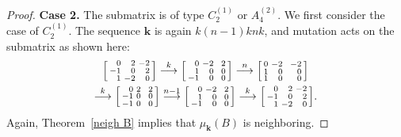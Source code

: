 \documentclass[10pt]{article}
\theoremstyle{definition}
\theoremstyle{remark}
\numberwithin{equation}{section}
\newcommand{\0}{{\mathbf{0}}}
\newcommand{\kk}{{\boldsymbol{k}}}
\begin{document}
\begin{proof}
\noindent
\textbf{Case 2.}
The submatrix is of type $C_2^{(1)}$ or $A_4^{(2)}$.
We first consider the case of $C_2^{(1)}$.
The sequence $\kk$ is again $k(n-1)knk$, and mutation acts on the submatrix as shown here:
\begin{multline*}
\begin{bsmallmatrix*}[r]
0&2&-2\\
-1&0&2\\
1&-2&0
\end{bsmallmatrix*}
\overset{k}{\longrightarrow}
\begin{bsmallmatrix*}[r]
0&-2&\,\,\,2\\
1&0&0\\
-1&0&0
\end{bsmallmatrix*}
\overset{n}{\longrightarrow}
\begin{bsmallmatrix*}[r]
0&-2&\,\,\,-2\\
1&0&0\\
1&0&0
\end{bsmallmatrix*}\\
\overset{k}{\longrightarrow}
\begin{bsmallmatrix*}[r]
0&2&\,\,\,2\\
-1&0&0\\
-1&0&0
\end{bsmallmatrix*}
\overset{n-1}{\longrightarrow}
\begin{bsmallmatrix*}[r]
0&-2&\,\,\,2\\
1&0&0\\
-1&0&0
\end{bsmallmatrix*}
\overset{k}{\longrightarrow}
\begin{bsmallmatrix*}[r]
0&2&-2\\
-1&0&2\\
1&-2&0
\end{bsmallmatrix*}.
\end{multline*}
Again, Theorem~\ref{neigh B} implies that $\mu_\kk(B)$ is neighboring.


\end{proof}
\end{document}
